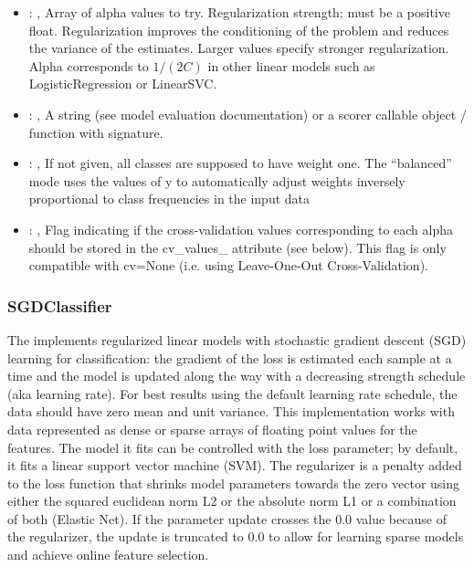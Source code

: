\begin{itemize}
    \item {}: , 
      Array of alpha values to try. Regularization strength; must be a positive float.
      Regularization                                                  improves the conditioning of
      the problem and reduces the variance of the estimates.
      Larger values specify stronger regularization. Alpha corresponds to $1 / (2C)$ in other
      linear models such as LogisticRegression or LinearSVC.

    \item {}: , 
      A string (see model evaluation documentation) or a scorer
      callable object / function with signature.

    \item {}: \xmlDesc{[balanced]}, 
      If not given, all classes are supposed to have weight one.
      The “balanced” mode uses the values of y to automatically adjust weights
      inversely proportional to class frequencies in the input data

    \item {}: , 
      Flag indicating if the cross-validation values corresponding
      to each alpha should be stored in the cv\_values\_ attribute (see below).
      This flag is only compatible with cv=None (i.e. using Leave-One-Out
      Cross-Validation).
  \end{itemize}


\subsubsection{SGDClassifier}
  The  implements regularized linear models with stochastic
  gradient descent (SGD) learning for classification: the gradient of the loss is estimated each
  sample at                         a time and the model is updated along the way with a decreasing
  strength schedule                         (aka learning rate). For best results using the default
  learning rate schedule, the                         data should have zero mean and unit variance.
  This implementation works with data represented as dense or sparse arrays of floating
  point values for the features. The model it fits can be controlled with the loss parameter;
  by default, it fits a linear support vector machine (SVM).                         The regularizer
  is a penalty added to the loss function that shrinks model parameters towards
  the zero vector using either the squared euclidean norm L2 or the absolute norm L1 or a
  combination of both (Elastic Net). If the parameter update crosses the 0.0 value because
  of the regularizer, the update is truncated to $0.0$ to allow for learning sparse models and
  achieve online feature selection.                         

